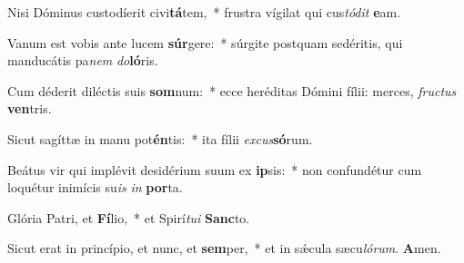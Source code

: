 ﻿\setcounter{versecount}{2}

\vs Nisi Dóminus custodíerit ci\-vi\-\textbf{tá}\-tem,~* frustra vígilat qui cus\textit{tó}\textit{dit} \textbf{e}am.

\vs Vanum est vobis ante lucem \textbf{súr}\-ge\-re:~* súrgite postquam sedéritis, qui manducátis pa\textit{nem} \textit{do}\textbf{ló}ris.

\vs Cum déderit diléctis suis \textbf{som}\-num:~* ecce heréditas Dómini fílii: merces, \textit{fruc}\textit{tus} \textbf{ven}tris.

\vs Sicut sagíttæ in manu pot\textbf{én}tis:~* ita fílii \textit{ex}\textit{cus}\textbf{só}rum.

\vs Beátus vir qui implévit desidérium suum ex \textbf{ip}sis:~* non confundétur cum loquétur inimícis su\textit{is} \textit{in} \textbf{por}ta.

\vs Glória Patri, et \textbf{Fí}lio,~* et Spirí\textit{tu}\textit{i} \textbf{Sanc}to.

\vs Sicut erat in princípio, et nunc, et \textbf{sem}per,~* et in sǽcula sæcu\textit{ló}\textit{rum}. \textbf{A}men.

